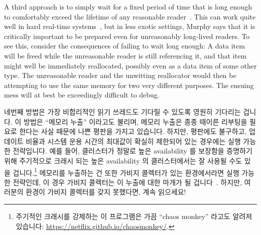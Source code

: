 A third approach is to simply wait for a fixed period of time that is
long enough to comfortably exceed the lifetime of any reasonable
reader~\cite{Jacobson93,AjuJohn95}.
This can work quite well in hard real-time systems~\cite{YuxinRen2018RTRCU},
but in less exotic
settings, Murphy says that it is critically important to be prepared
even for unreasonably long-lived readers.
To see this, consider the consequences of failing to wait long enough:
A data item will be freed while the unreasonable reader is still
referencing it, and that item might well be immediately reallocated,
possibly even as a data item of some other type.
The unreasonable reader and the unwitting reallocator would then
be attempting to use the same memory for two very different purposes.
The ensuing mess will at best be exceedingly difficult to debug.
\fi

네번째 방법은 가장 비합리적인 읽기 쓰레드도 기다릴 수 있도록 영원히 기다리는
겁니다.
이 방법은 ``메모리 누출'' 이라고도 불리며, 메모리 누출은 종종 때이른 리부팅을
필요로 한다는 사실 때문에 나쁜 평판을 가지고 있습니다.
하지만, 평판에도 불구하고, 업데이트 비율과 시스템 운용 시간의 최대값이 확실히
제한되어 있는 경우에는 실행 가능한 전략입니다.
예를 들어, 클러스터가 정말로 높은 availability 를 보장함을 증명하기 위해
주기적으로 크래시 되는 높은 availability 의 클러스터에서는 잘 사용될 수도 있을
겁니다.\footnote{
	주기적인 크래시를 강제하는 이 프로그램은 가끔 ``chaos monkey'' 라고도
	알려져 있습니다:
	\url{https://netflix.github.io/chaosmonkey/}.}
메모리를 누출하는 건 또한 가비지 콜렉터가 있는 환경에서라면 실행 가능한
전략인데, 이 경우 가비지 콜렉터는 이 누출에 대한 마개가 될
겁니다~\cite{Kung80}.
하지만, 여러분의 환경이 가비지 콜렉터를 갖지 못했다면, 계속 읽으세요!


